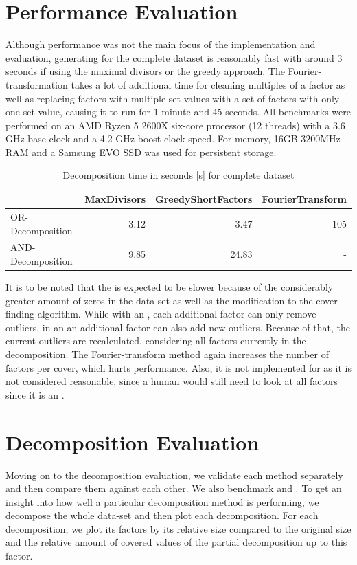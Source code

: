 \section{Performance Evaluation}
\label{ch:Evaluation:performance}
Although performance was not the main focus of the implementation and evaluation, generating \orDecomp for the complete dataset is reasonably fast with around 3 seconds if using the maximal divisors or the greedy approach.
The Fourier-transformation takes a lot of additional time for cleaning multiples of a factor as well as replacing factors with multiple set values with a set of factors with only one set value, causing it to run for 1 minute and 45 seconds.
All benchmarks were performed on an AMD Ryzen 5 2600X six-core processor (12 threads) with a 3.6 GHz base clock and a 4.2 GHz boost clock speed. For memory, 16GB 3200MHz RAM and a Samsung EVO SSD was used for persistent storage.
\begin{table}[h]
	\begin{tabular}{l|rrr}
		 & MaxDivisors & GreedyShortFactors & FourierTransform  \\
		\hline
		 OR-Decomposition & 3.12 & 3.47 & 105 \\
		 AND-Decomposition & 9.85 & 24.83 & - \\
		 	
	\end{tabular}
	\caption{Decomposition time in seconds [s] for complete dataset}
	\label{tab:eval-performance}
\end{table}
It is to be noted that the \andDecomp is expected to be slower because of the considerably greater amount of zeros in the data set as well as the modification to the cover finding algorithm.
While with an \orDecomp, each additional factor can only remove outliers, in an \andDecomp an additional factor can also add new outliers.
Because of that, the current outliers  are recalculated, considering all factors currently in the decomposition.
The Fourier-transform method again increases the number of factors per cover, which hurts performance.
Also, it is not implemented for \andDecomp as it is not considered reasonable, since a human would still need to look at all factors since it is an \andDecomp.

\section{Decomposition Evaluation}
\label{ch:Evaluation:decomposition-quality}
Moving on to the decomposition evaluation, we validate each method separately and then compare them against each other.
We also benchmark \andDecomp and \orDecomp.
To get an insight into how well a particular decomposition method is performing, we decompose the whole data-set and then plot each decomposition.
For each decomposition, we plot its factors by its relative size compared to the original \DFA size and the relative amount of covered values of the partial decomposition up to this factor.

